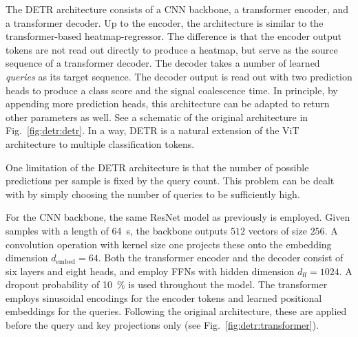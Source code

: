 
The DETR architecture consists of a CNN backbone, a transformer encoder, and a transformer decoder. Up to the encoder, the architecture is similar to the transformer-based heatmap-regressor. The difference is that the encoder output tokens are not read out directly to produce a heatmap, but serve as the source sequence of a transformer decoder. 
The decoder takes a number of learned \emph{queries} as its target sequence. The decoder output is read out with two prediction heads to produce a class score and the signal coalescence time. In principle, by appending more prediction heads, this architecture can be adapted to return other parameters as well.
See a schematic of the original architecture in Fig.~\ref{fig:detr:detr}. In a way, DETR is a natural extension of the ViT~\cite{dosovitskiy2021an} architecture to multiple classification tokens.

One limitation of the DETR architecture is that the number of possible predictions per sample is fixed by the query count. This problem can be dealt with by simply choosing the number of queries to be sufficiently high. 


For the CNN backbone, the same ResNet model as previously is employed. Given samples with a length of \SI{64}{\second}, the backbone outputs $512$ vectors of size $256$. A convolution operation with kernel size one projects these onto the embedding dimension $d_\text{embed}=64$. Both the transformer encoder and the decoder consist of six layers and eight heads, and employ FFNs with hidden dimension $d_\text{ff}=1024$. A dropout probability of \SI{10}{\percent} is used throughout the model. The transformer employs sinusoidal encodings for the encoder tokens and learned positional embeddings for the queries. Following the original architecture, these are applied before the query and key projections only (see Fig.~\ref{fig:detr:transformer}).

